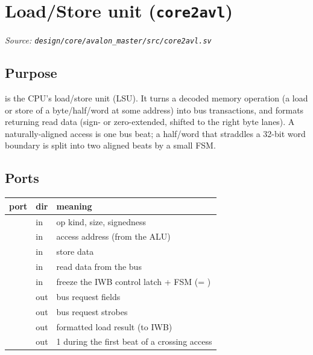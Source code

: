 \section{Load/Store unit (\texttt{core2avl})}
\textit{Source: \texttt{design/core/avalon\_master/src/core2avl.sv}}

\subsection{Purpose}
 is the CPU's load/store unit (LSU). It turns a decoded memory
operation (a load or store of a byte/half/word at some address) into bus
transactions, and formats returning read data (sign- or zero-extended, shifted to
the right byte lanes). A naturally-aligned access is one bus beat; a half/word
that straddles a 32-bit word boundary is split into two aligned beats by a small
FSM.


\subsection{Ports}
\begin{center}\small
\begin{tabularx}{\textwidth}{>{\raggedright\arraybackslash}p{4.3cm} l Y}
\toprule
\textbf{port} & \textbf{dir} & \textbf{meaning}\\\midrule
{} & in & op kind, size, signedness\\
        & in  & access address (from the ALU)\\
  & in  & store data\\
    & in  & read data from the bus\\
       & in  & freeze the IWB control latch + FSM (= )\\
 & out & bus request fields\\
 & out & bus request strobes\\
   & out & formatted load result (to IWB)\\
 & out & 1 during the first beat of a crossing access\\
\bottomrule
\end{tabularx}
\end{center}

